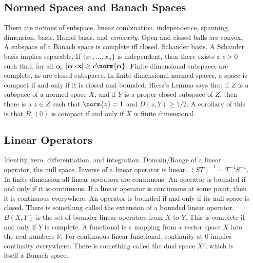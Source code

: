         \subsection{Normed Spaces and Banach Spaces}
            There are notions of subspace,
            linear combination, independence, spanning,
            dimension, basis, Hamel basis, and
            \textit{convexity}.
            Open and closed balls are convex.
            A subspace of a Banach space is complete
            iff closed. Schauder basis.
            A Schauder basis implies separable.
            If $\{x_{1},\hdots,x_{n}\}$ is independent,
            then there exists a $c>0$ such that, for all
            $\boldsymbol{\alpha}$,
            $|\boldsymbol{\alpha}\cdot\mathbf{x}|%
             \geq{c}\norm{\boldsymbol{\alpha}}$.
            Finite dimensional subspaces are complete,
            as are closed subspaces. In finite dimensional
            normed spaces, a space is compact if and only
            if it is closed and bounded.
            Riesz's Lemma says that if $Z$ is a subspace
            of a normed space $X$, and if $Y$ is a proper
            closed subspace of $Z$, then there is a $z\in{Z}$
            such that $\norm{z}=1$ and $D(z,Y)\geq{1/2}$.
            A corollary of this is that $B_{1}(0)$ is compact
            if and only if $X$ is finite dimensional.
        \subsection{Linear Operators}
            Identity, zero, differentiation,
            and integration. Domain/Range
            of a linear operator, the null space.
            Inverse of a linear operator is linear.
            $(ST)^{-1}=T^{-1}S^{-1}$.
            In finite dimension all linear operators are
            continuous. An operator is bounded
            if and only if it is continuous. If a linear
            operator is continuous at some point, then it
            is continuous everywhere. An operator is bounded
            if and only if its null space is closed.
            There is something called the extension of a
            bounded linear operator. $B(X,Y)$ is the set of
            bounder linear operators
            from $X$ to $Y$. This is complete if and only if
            $Y$ is complete. A functional is a mapping from a
            vector space $X$ into the real numbers $\mathbb{R}$.
            For continuous linear functional, continuity at
            $0$ implies continuity everywhere.
            There is something called the dual space
            $X'$, which is itself a Banach space.
